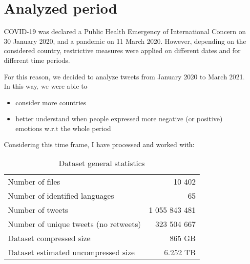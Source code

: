 \section{Analyzed period}
\label{sec:period}
COVID-19 was declared a Public Health Emergency of International Concern on 30 January 2020, and a pandemic on 11 March 2020. However, depending on the considered country, restrictive measures were applied on different dates and for different time periods. 

For this reason, we decided to analyze tweets from January 2020 to March 2021. In this way, we were able to

\begin{itemize}
	\item consider more countries
	\item better understand when people expressed more negative (or positive) emotions w.r.t the whole period
\end{itemize}

Considering this time frame, I have processed and worked with:

\begin{table}[H]
    \centering
    \begin{tabularx}{\columnwidth}{@{}Xr@{}}
        Number of files & 10 402
        \\
        Number of identified languages & 65
        \\
        Number of tweets & 1 055 843 481
        \\
        Number of unique tweets (no retweets) & 323 504 667
        \\
        Dataset compressed size & 865 GB
        \\
        Dataset estimated uncompressed size & 6.252 TB
    \end{tabularx}
    \caption{Dataset general statistics}
    \label{tab:dataset-stats}
\end{table}

